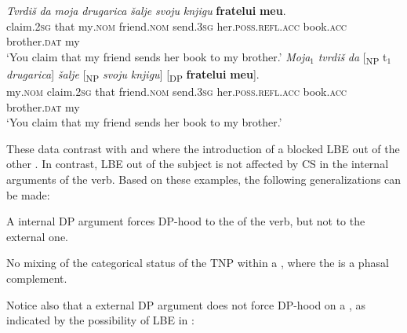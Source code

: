 \documentclass[output=paper,hidelinks,newtxmath,]{langscibook}
\begin{document}
\ea \label{15:ex30}
	\ea\label{15:ex30a}
    \gll \textit{Tvrdiš} \textit{da} \textit{moja} \textit{drugarica} \textit{šalje} \textit{svoju} \textit{knjigu} \textbf{fratelui} \textbf{meu}.\\          
         claim\textsc{.2sg} that my\textsc{.nom} friend\textsc{.nom} send\textsc{.3sg} her\textsc{.poss.refl.acc} book\textsc{.acc} brother\textsc{.dat} my\\
         \glt `You claim that my friend sends her book to my brother.'
	\ex\label{15:ex30b}
	 \gll \textit{Moja}$_1$ \textit{tvrdiš} \textit{da} [\textsubscript{NP} t$_1$ \textit{drugarica}] \textit{šalje}\hspace{3.5cm} [\textsubscript{NP} \textit{svoju} \textit{knjigu}] [\textsubscript{DP} \textbf{fratelui} \textbf{meu}].\\
         my\textsc{.nom} claim\textsc{.2sg} that {} {} friend\textsc{.nom} send\textsc{.3sg} {} her\textsc{.poss.refl.acc} book\textsc{.acc} {} brother\textsc{.dat} my\\ 
         \glt `You claim that my friend sends her book to my brother.'
	\z
\z

\noindent These data contrast with  and  where the introduction of a   blocked LBE out of the other . In contrast, LBE out of the subject is not affected by CS in the internal arguments of the verb. Based on these examples, the following generalizations can be made:

\ea\label{15:ex31}
  A  internal DP argument forces DP-hood to the  of the verb, but not to the external one.
\z

\ea\label{15:ex32}
  No mixing of the categorical status of the TNP within a , where the  is a phasal complement.
\z

\noindent Notice also that a  external DP argument does not force DP-hood on a  , as indicated by the possibility of LBE in :

\ea \label{15:ex33}
	\z
\z
\end{document}
